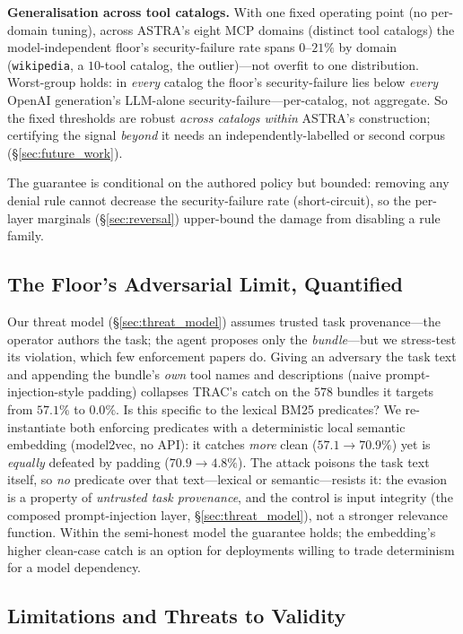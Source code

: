 \documentclass[sigconf,review,anonymous]{acmart}
\begin{document}
\textbf{Generalisation across tool catalogs.} With one fixed operating point (no per-domain tuning), across ASTRA's eight MCP domains (distinct tool catalogs) the model-independent floor's security-failure rate spans $0$--$21\%$ by domain (\texttt{wikipedia}, a $10$-tool catalog, the outlier)---not overfit to one distribution. Worst-group holds: in \emph{every} catalog the floor's security-failure lies below \emph{every} OpenAI generation's LLM-alone security-failure---per-catalog, not aggregate. So the fixed thresholds are robust \emph{across catalogs within} ASTRA's construction; certifying the signal \emph{beyond} it needs an independently-labelled or second corpus (\S\ref{sec:future_work}).

The guarantee is conditional on the authored policy but bounded: removing any denial rule cannot decrease the security-failure rate (short-circuit), so the per-layer marginals (\S\ref{sec:reversal}) upper-bound the damage from disabling a rule family.

\subsection{The Floor's Adversarial Limit, Quantified}
\label{sec:adversarial}
Our threat model (\S\ref{sec:threat_model}) assumes trusted task provenance---the operator authors the task; the agent proposes only the \emph{bundle}---but we stress-test its violation, which few enforcement papers do. Giving an adversary the task text and appending the bundle's \emph{own} tool names and descriptions (naive prompt-injection-style padding) collapses TRAC's catch on the $578$ bundles it targets from $57.1\%$ to $0.0\%$. Is this specific to the lexical BM25 predicates? We re-instantiate both enforcing predicates with a deterministic local semantic embedding (model2vec, no API): it catches \emph{more} clean ($57.1\!\to\!70.9\%$) yet is \emph{equally} defeated by padding ($70.9\!\to\!4.8\%$). The attack poisons the task text itself, so \emph{no} predicate over that text---lexical or semantic---resists it: the evasion is a property of \emph{untrusted task provenance}, and the control is input integrity (the composed prompt-injection layer, \S\ref{sec:threat_model}), not a stronger relevance function. Within the semi-honest model the guarantee holds; the embedding's higher clean-case catch is an option for deployments willing to trade determinism for a model dependency.

\subsection{Limitations and Threats to Validity}
\label{sec:limitations}
\end{document}

